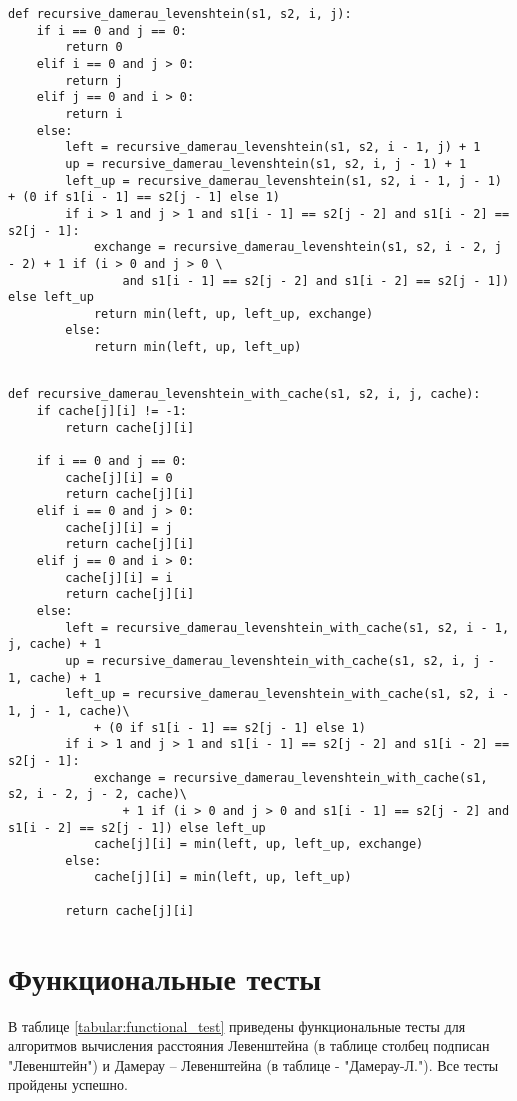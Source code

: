 \begin{lstlisting}[label=lst:rec_dl,caption=Функция нахождения расстояния Дамерау -- Левенштейна с использованием рекурсии.]
def recursive_damerau_levenshtein(s1, s2, i, j):
    if i == 0 and j == 0:
        return 0
    elif i == 0 and j > 0:
        return j
    elif j == 0 and i > 0:
        return i
    else:
        left = recursive_damerau_levenshtein(s1, s2, i - 1, j) + 1
        up = recursive_damerau_levenshtein(s1, s2, i, j - 1) + 1
        left_up = recursive_damerau_levenshtein(s1, s2, i - 1, j - 1) + (0 if s1[i - 1] == s2[j - 1] else 1)
        if i > 1 and j > 1 and s1[i - 1] == s2[j - 2] and s1[i - 2] == s2[j - 1]:
            exchange = recursive_damerau_levenshtein(s1, s2, i - 2, j - 2) + 1 if (i > 0 and j > 0 \
                and s1[i - 1] == s2[j - 2] and s1[i - 2] == s2[j - 1]) else left_up
            return min(left, up, left_up, exchange)
        else:
            return min(left, up, left_up)
	
\end{lstlisting}

\begin{lstlisting}[label=lst:rec_dl_cache,caption=Функция нахождения расстояния Дамерау -- Левенштейна рекурсивным методом с использованием кеша.]
def recursive_damerau_levenshtein_with_cache(s1, s2, i, j, cache):
    if cache[j][i] != -1:
        return cache[j][i]
    
    if i == 0 and j == 0:
        cache[j][i] = 0
        return cache[j][i]
    elif i == 0 and j > 0:
        cache[j][i] = j
        return cache[j][i]
    elif j == 0 and i > 0:
        cache[j][i] = i
        return cache[j][i]
    else:
        left = recursive_damerau_levenshtein_with_cache(s1, s2, i - 1, j, cache) + 1
        up = recursive_damerau_levenshtein_with_cache(s1, s2, i, j - 1, cache) + 1
        left_up = recursive_damerau_levenshtein_with_cache(s1, s2, i - 1, j - 1, cache)\
            + (0 if s1[i - 1] == s2[j - 1] else 1)
        if i > 1 and j > 1 and s1[i - 1] == s2[j - 2] and s1[i - 2] == s2[j - 1]:
            exchange = recursive_damerau_levenshtein_with_cache(s1, s2, i - 2, j - 2, cache)\
                + 1 if (i > 0 and j > 0 and s1[i - 1] == s2[j - 2] and s1[i - 2] == s2[j - 1]) else left_up
            cache[j][i] = min(left, up, left_up, exchange)
        else:
            cache[j][i] = min(left, up, left_up)
        
        return cache[j][i]
\end{lstlisting}

\section{Функциональные тесты}
В таблице \ref{tabular:functional_test} приведены функциональные тесты для алгоритмов вычисления расстояния Левенштейна (в таблице столбец подписан "Левенштейн") и Дамерау -- Левенштейна (в таблице - "Дамерау-Л."). Все тесты пройдены успешно.


